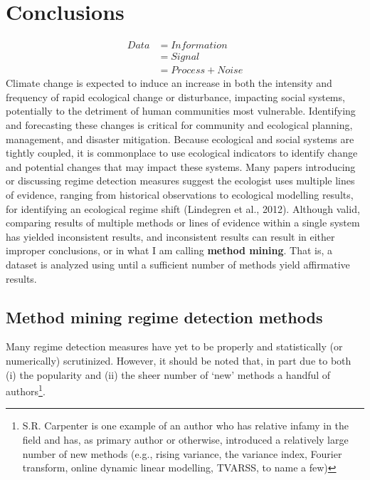 \documentclass[12pt,twoside,openany]{reedthesis}
\begin{document}
\hypertarget{conclusions-1}{%
\chapter{Conclusions}\label{conclusions-1}}
\begin{equation}
\begin{split}
Data  & = Information \\
& = Signal \\
& = Process + Noise
\end{split}
\label{eq:infoTheory}
\end{equation}
Climate change is expected to induce an increase in both the intensity and frequency of rapid ecological change or disturbance, impacting social systems, potentially to the detriment of human communities most vulnerable. Identifying and forecasting these changes is critical for community and ecological planning, management, and disaster mitigation. Because ecological and social systems are tightly coupled, it is commonplace to use ecological indicators to identify change and potential changes that may impact these systems. Many papers introducing or discussing regime detection measures suggest the ecologist uses multiple lines of evidence, ranging from historical observations to ecological modelling results, for identifying an ecological regime shift (Lindegren et al., 2012). Although valid, comparing results of multiple methods or lines of evidence within a single system has yielded inconsistent results, and inconsistent results can result in either improper conclusions, or in what I am calling \textbf{method mining}. That is, a dataset is analyzed using until a sufficient number of methods yield affirmative results.

\hypertarget{method-mining-regime-detection-methods}{%
\section{Method mining regime detection methods}\label{method-mining-regime-detection-methods}}

Many regime detection measures have yet to be properly and statistically (or numerically) scrutinized. However, it should be noted that, in part due to both (i) the popularity and (ii) the sheer number of `new' methods a handful of authors\footnote{S.R. Carpenter is one example of an author who has relative infamy in the field and has, as primary author or otherwise, introduced a relatively large number of new methods (e.g., rising variance, the variance index, Fourier transform, online dynamic linear modelling, TVARSS, to name a few)}.
\end{document}
